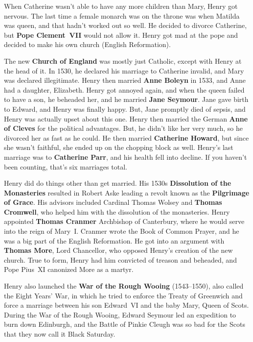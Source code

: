When Catherine wasn't able to have any more children than Mary, Henry got nervous.
The last time a female monarch was on the throne was when Matilda was queen,
and that hadn't worked out so well.
He decided to divorce Catherine, but \textbf{Pope Clement~VII} would not allow it.
Henry got mad at the pope and decided to make his own church (English Reformation).

The new \textbf{Church of England} was mostly just Catholic, except with Henry at the head of it.
In 1530, he declared his marriage to Catherine invalid, and Mary was declared illegitimate.
Henry then married \textbf{Anne Boleyn} in 1533, and Anne had a daughter, Elizabeth.
Henry got annoyed again, and when the queen failed to have a son, he beheaded her, and he married \textbf{Jane Seymour}.
Jane gave birth to Edward, and Henry was finally happy.
But, Jane promptly died of sepsis, and Henry was actually upset about this one.
Henry then married the German \textbf{Anne of Cleves} for the political advantages.
But, he didn't like her very much, so he divorced her as fast as he could.
He then married \textbf{Catherine Howard}, but since she wasn't faithful,
she ended up on the chopping block as well.
Henry's last marriage was to \textbf{Catherine Parr}, and his health fell into decline.
If you haven't been counting, that's six marriages total.

Henry did do things other than get married.
His 1530s \textbf{Dissolution of the Monasteries} resulted in
Robert Aske leading a revolt known as the \textbf{Pilgrimage of Grace}.
His advisors included Cardinal Thomas Wolsey and \textbf{Thomas Cromwell},
who helped him with the dissolution of the monasteries.
Henry appointed \textbf{Thomas Cranmer} Archbishop of Canterbury,
where he would serve into the reign of Mary~I.
Cranmer wrote the Book of Common Prayer, and he was a big part of the English Reformation.
He got into an argument with \textbf{Thomas More}, Lord Chancellor, who opposed Henry's creation of the new church.
True to form, Henry had him convicted of treason and beheaded, and Pope Pius~XI canonized More as a martyr.

Henry also launched the \textbf{War of the Rough Wooing} (1543--1550), also called the Eight Years' War,
in which he tried to enforce the Treaty of Greenwich
and force a marriage between his son Edward~VI and the baby Mary, Queen of Scots.
During the War of the Rough Wooing, Edward Seymour led an expedition to burn down Edinburgh,
and the Battle of Pinkie Cleugh was so bad for the Scots that they now call it Black Saturday.

